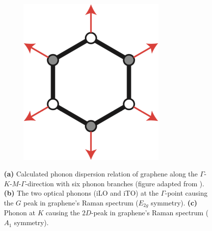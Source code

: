 \begin{figure}[!h]
\begin{subfigure}[t]{0.25\textwidth}
    \includegraphics[width=0.8\textwidth]{./images/2d-mode-phonon.png}
  \end{subfigure}
  \caption{\textbf{(a)} Calculated phonon dispersion relation of graphene along the $\Gamma$-$K$-$M$-$\Gamma$-direction with six phonon branches (figure adapted from \cite{Malard2009}). \textbf{(b)} The two optical phonons (iLO and iTO) at the $\Gamma$-point causing the $G$ peak in graphene's Raman spectrum ($E_{2g}$ symmetry). \textbf{(c)} Phonon at $K$ causing the $2D$-peak in graphene's Raman spectrum ($A_1$ symmetry).}
  \label{fig:phonons}
\end{figure}

\newpage

